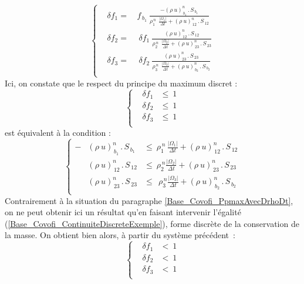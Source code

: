 \begin{equation}
\left\{\begin{array}{lll}
&\delta f_1 =& \,f_{\,b_1}\displaystyle\ \frac{- ( \rho\ u)^n_{\,b_1}\,.\,S_{\,b_1}}{\rho_1^{\,n}\ \displaystyle\ \frac{|\Omega_1|}{\Delta
t} + (\rho\ u)^n_{\,12}\,.\,S_{\,12}}\\
&\delta f_2 =&\ \,\delta f_1 \displaystyle\ \frac{(\rho\
u)^n_{\,12}\,.\,S_{\,12}}{\rho_2^{\,n}\ \displaystyle\ \frac{|\Omega_2|}{\Delta t} + (\rho\ u)^n_{\,23}\,.\,S_{\,23}}\\
&\delta f_3 =&\ \,\delta f_2 \displaystyle\ \frac{(\rho\
u)^n_{\,23}\,.\,S_{\,23}}{\rho_3^{\,n}\ \displaystyle\ \frac{|\Omega_3|}{\Delta
t} + (\rho\ u)^n_{\,b_2}\,.\,S_{\,b_2}}\\
\end{array}\right.
\end{equation}
Ici, on constate que le respect du principe du maximum discret :\\
\begin{equation}
\left\{\begin{array}{lll}
&\delta f_1 &\leqslant \ 1 \\
&\delta f_2 &\leqslant \ 1 \\
&\delta f_3 &\leqslant \ 1 \\
\end{array}\right.
\end{equation}
est \'equivalent \`a la condition :
\begin{equation}
\left\{\begin{array}{lll}
- &( \rho\ u)^n_{\,b_1}\,.\,S_{\,b_1}&\leqslant \displaystyle\ \rho_1^{\,n}
\,\frac{|\Omega_1|}{\Delta t} + (\rho\ u)^n_{\,12}\,.\,S_{\,12}\\
&(\rho\ u)^n_{\,12}\,.\,S_{\,12}&\leqslant \displaystyle\ \rho_2^{\,n}
\frac{|\Omega_2|}{\Delta t} + (\rho\ u)^n_{\,23}\,.\,S_{\,23}\\
& (\rho\ u)^n_{\,23}\,.\,S_{\,23}&\leqslant \ \displaystyle\ \rho_3^{\,n}
\frac{|\Omega_3|}{\Delta t} + (\rho\ u)^n_{\,b_2}\,.\,S_{\,b_2}\\
\end{array}\right.
\end{equation}
Contrairement \`a la situation du paragraphe
\ref{Base_Covofi_PpmaxAvecDrhoDt}, on ne peut obtenir ici un r\'esultat qu'en
faisant intervenir l'\'egalit\'e (\ref{Base_Covofi_ContinuiteDiscreteExemple}), forme
discr\`ete de la conservation de la masse. On obtient bien alors, \`a partir du
syst\`eme pr\'ec\'edent~:
\begin{equation}
\left\{\begin{array}{lll}
&\delta f_1 &< \ 1 \\
&\delta f_2 &< \ 1 \\
&\delta f_3 &< \ 1 \\
\end{array}\right.
\end{equation}

